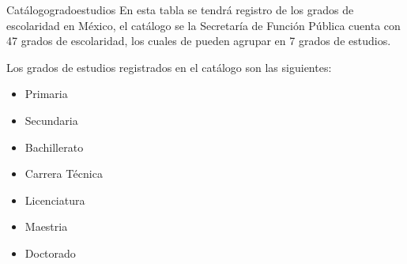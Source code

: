 \begin{BD}{Catálogo}{gradoestudios}{
		En esta tabla se tendrá registro de los grados de escolaridad en México, el catálogo se la Secretaría de Función Pública cuenta con 47 grados de escolaridad, los cuales de pueden agrupar en 7 grados de estudios. \cite{GE}
		\bigskip
} %
		

			
\end{BD}

Los grados de estudios registrados en el catálogo son las siguientes:
\\
\begin{itemize}
    \item Primaria
	\item Secundaria
	\item Bachillerato
	\item Carrera Técnica
	\item Licenciatura
	\item Maestria
	\item Doctorado

\end{itemize}

